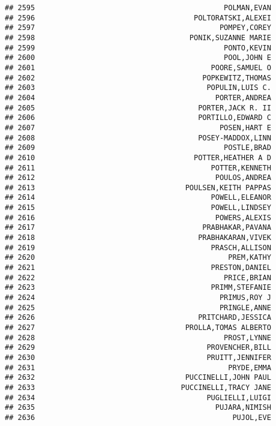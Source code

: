 \documentclass[
]{article}
\begin{document}
\begin{verbatim}
## 2595                                            POLMAN,EVAN
## 2596                                     POLTORATSKI,ALEXEI
## 2597                                           POMPEY,COREY
## 2598                                    PONIK,SUZANNE MARIE
## 2599                                            PONTO,KEVIN
## 2600                                            POOL,JOHN E
## 2601                                         POORE,SAMUEL O
## 2602                                       POPKEWITZ,THOMAS
## 2603                                        POPULIN,LUIS C.
## 2604                                          PORTER,ANDREA
## 2605                                      PORTER,JACK R. II
## 2606                                      PORTILLO,EDWARD C
## 2607                                           POSEN,HART E
## 2608                                      POSEY-MADDOX,LINN
## 2609                                            POSTLE,BRAD
## 2610                                     POTTER,HEATHER A D
## 2611                                         POTTER,KENNETH
## 2612                                          POULOS,ANDREA
## 2613                                   POULSEN,KEITH PAPPAS
## 2614                                         POWELL,ELEANOR
## 2615                                         POWELL,LINDSEY
## 2616                                          POWERS,ALEXIS
## 2617                                       PRABHAKAR,PAVANA
## 2618                                      PRABHAKARAN,VIVEK
## 2619                                         PRASCH,ALLISON
## 2620                                             PREM,KATHY
## 2621                                         PRESTON,DANIEL
## 2622                                            PRICE,BRIAN
## 2623                                         PRIMM,STEFANIE
## 2624                                           PRIMUS,ROY J
## 2625                                           PRINGLE,ANNE
## 2626                                      PRITCHARD,JESSICA
## 2627                                   PROLLA,TOMAS ALBERTO
## 2628                                            PROST,LYNNE
## 2629                                        PROVENCHER,BILL
## 2630                                        PRUITT,JENNIFER
## 2631                                             PRYDE,EMMA
## 2632                                   PUCCINELLI,JOHN PAUL
## 2633                                  PUCCINELLI,TRACY JANE
## 2634                                        PUGLIELLI,LUIGI
## 2635                                          PUJARA,NIMISH
## 2636                                              PUJOL,EVE

\end{verbatim}
\end{document}

